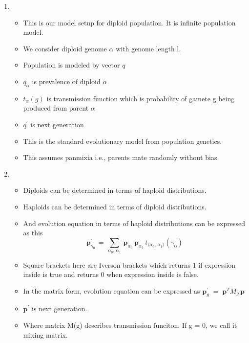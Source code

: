 \documentclass{article}
\begin{document}
\begin{enumerate}
\item
  \begin{itemize}
  \item This is our model setup for diploid population. It is infinite population model.
  \item We consider diploid genome $\alpha$ with genome length l.
  \item Population is modeled by vector $q$
  \item $q_\alpha$ is prevalence of diploid $\alpha$
  \item $t_{\alpha}(g)$ is transmission function which is probability
    of gamete g being produced from parent $\alpha$
  \item $q^\prime$ is next generation
  \item This is the standard evolutionary model from population genetics. 
  \item This assumes panmixia i.e., parents mate randomly without bias.
  \end{itemize}
    
\item
  \begin{itemize}
  \item Diploids can be determined in terms of haploid
    distributions.
  \item Haploids can be determined in terms of diploid
    distributions.
  \item And evolution equation in terms of haploid
    distributions can be expressed as this
    \[\bm{p}_{\gamma_0}^{\prime} \,=\, \sum_{\alpha_0, \, \alpha_1} \, \bm{p}_{\alpha_0} \, \bm{p}_{\alpha_1} \,
	  t_{\langle \alpha_0, \,\alpha_1 \rangle}(\gamma_0) \]	  
  \item Square brackets here are Iverson brackets which returns 1 if expression inside is true and returns 0 when expression inside is false.  
  
  \item In the matrix form, evolution equation can be expressed as $\bm{p}_g^\prime \; = \; \bm{p}^T M_g \, \bm{p}$
  \item $\bm{p}^\prime$ is next generation.
  \item Where matrix M(g) describes transmission funciton. If g = 0, we call it mixing matrix.
  \end{itemize}
    

\end{enumerate}
\end{document}
